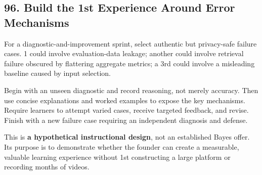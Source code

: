 \subsection*{96. Build the 1st Experience Around Error Mechanisms}

For a diagnostic-and-improvement sprint, select authentic but privacy-safe failure cases. 1 could involve evaluation-data leakage; another could involve retrieval failure obscured by flattering aggregate metrics; a 3rd could involve a misleading baseline caused by input selection.

Begin with an unseen diagnostic and record reasoning, not merely accuracy. Then use concise explanations and worked examples to expose the key mechanisms. Require learners to attempt varied cases, receive targeted feedback, and revise. Finish with a new failure case requiring an independent diagnosis and defense.

This is \textbf{a hypothetical instructional design}, not an established Bayes offer. Its purpose is to demonstrate whether the founder can create a measurable, valuable learning experience without 1st constructing a large platform or recording months of videos.
